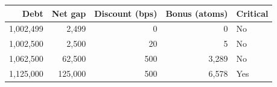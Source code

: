 \begin{center}\small
\begin{tabular}{@{}rrrrl@{}}
\toprule
Debt & Net gap & Discount (bps) & Bonus (atoms) & Critical \\
\midrule
1,002,499 & 2,499 & 0 & 0 & No \\
1,002,500 & 2,500 & 20 & 5 & No \\
1,062,500 & 62,500 & 500 & 3,289 & No \\
1,125,000 & 125,000 & 500 & 6,578 & Yes \\
\bottomrule
\end{tabular}
\end{center}

